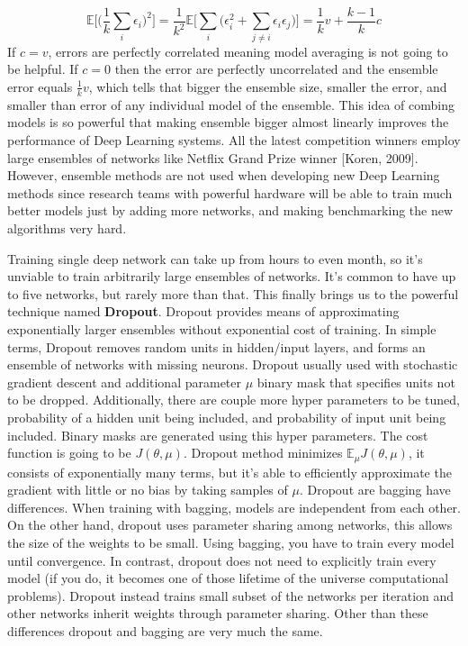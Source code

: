 \documentclass[paper=a4, fontsize=11pt]{scrartcl}
\numberwithin{equation}{section}		%
\numberwithin{figure}{section}			%
\numberwithin{table}{section}			%
\begin{document}
	$$
	\mathbb E\bigg[\bigg(\frac{1}{k}\sum_i \epsilon_i\bigg)^2\bigg] = \frac{1}{k^2}\mathbb E\bigg[  \sum_i\bigg( \epsilon_i^2 + \sum_{j \not = i} \epsilon_i\epsilon_j \bigg) \bigg] = \frac{1}{k}v + \frac{k-1}{k}c
	$$
	If $c = v $, errors are perfectly correlated meaning model averaging is not going to be helpful. If $c=0$
	then the error are perfectly uncorrelated and the ensemble error equals $\frac{1}{k}v$, which tells that bigger the ensemble size, smaller the error, and smaller than error of any individual model of the ensemble.
	This idea of combing models is so powerful that making ensemble bigger almost linearly improves the performance of Deep Learning systems. All the latest competition winners employ large ensembles of networks like Netflix Grand Prize winner [Koren, 2009]. However, ensemble methods are not used when developing new Deep Learning methods since research teams with powerful hardware will be able to train much better models just by adding more networks, and making benchmarking the new algorithms very hard.
	\par
	Training single deep network can take up from hours to even month, so it's unviable to train arbitrarily large ensembles of networks. It's common to have up to five networks, but rarely more than that. This finally brings us to the powerful technique named \textbf{Dropout}. Dropout provides means of approximating exponentially larger ensembles without exponential cost of training.  In simple terms, Dropout removes random units in hidden/input layers, and forms an ensemble of networks with missing neurons. Dropout usually used with stochastic gradient descent and additional parameter $\mu$ binary mask that specifies units not to be dropped. Additionally, there are couple more hyper parameters to be tuned, probability of a hidden unit being included, and probability of input unit being included. Binary masks are generated using this hyper parameters. The cost function is going to be $J(\theta, \mu)$. Dropout method minimizes $\mathbb E_\mu J(\theta, \mu)$, it consists of exponentially many terms, but it's able to efficiently approximate the gradient with little or no bias by taking samples of $\mu$. Dropout are bagging have differences. When training with bagging, models are independent from each other. On the other hand, dropout uses parameter sharing among networks, this allows the size of the weights to be small. Using bagging, you have to train every model until convergence. In contrast, dropout does not need to explicitly train every model (if you do, it becomes one of those lifetime of the universe computational problems). Dropout instead trains small subset of the networks per iteration and other networks inherit weights through parameter sharing. Other than these differences dropout and bagging are very much the same.
\end{document}
